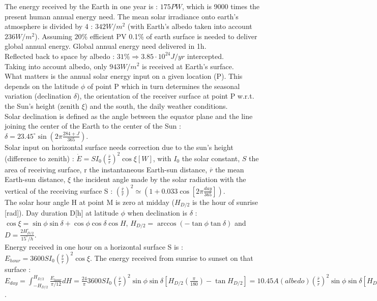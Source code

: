 \documentclass[../main.tex]{subfiles}
\begin{document}
The energy received by the Earth in one year is : $175PW$, which is 9000 times the present human annual energy need. The mean solar irradiance onto earth's atmosphere is divided by 4 : $342W/m^2$ (with Earth's albedo taken into account $236W/m^2$). Assuming $20\%$ efficient PV 0.1\% of earth surface is needed to deliver global annual energy. Global annual energy need delivered in 1h. \\

Reflected back to space by albedo : $31\% \Rightarrow 3.85\cdot 10^{24} J/yr$ intercepted.\\
\warning Taking into account albedo, only $943W/m^2$ is received at Earth's surface.\\

What matters is the annual solar energy input on a given location (P). This depends on the latitude $\phi$ of point P which in turn determines the seasonal variation (declination $\delta$), the orientation of the receiver surface at point P w.r.t. the Sun's height (zenith $\xi$) and the south, the daily weather conditions.\\
Solar declination is defined as the angle between the equator plane and the line joining the center of the Earth to the center of the Sun : $\delta = 23.45^\circ \sin(2\pi \frac{284+J}{365})$.\\

Solar input on horizontal surface needs correction due to the sun's height (difference to zenith) : $\dot{E} = SI_0 (\frac{\overline{r}}{r})^2 \cos \xi [W]$, with $I_0$ the solar constant, $S$ the area of receiving surface, r the instantaneous Earth-sun distance, $\overline{r}$ the mean Earth-sun distance, $\xi$ the incident angle made by the solar radiation with the vertical of the receiving surface S : $(\frac{\overline{r}}{r})^2 \simeq (1+0.033\cos[2\pi \frac{day}{365}])$.\\

The solar hour angle H at point M is zero at midday ($H_{D/2}$ is the hour of sunrise [rad]). Day duration D[h] at latitude $\phi$ when declination is $\delta$ : $\cos \xi = \sin \phi \sin \delta + \cos \phi \cos \delta \cos H$, $H_{D/2} = \arccos(-\tan \phi \tan \delta)$ and $D = \frac{2 H_{D/2}^\circ}{15^\circ/h}$.\\

Energy received in one hour on a horizontal surface S is : $E_{hour} = 3600 S I_0 (\frac{\overline{r}}{r})^2 \cos \xi$. The energy received from sunrise to sunset on that surface : $E_{day} = \int_{-H_{D/2}}^{H_{D/2}} \frac{E_{hour}}{\pi/12} dH = \frac{24}{\pi} 3600 S I_0 (\frac{\overline{r}}{r})^2 \sin\phi \sin \delta [H_{D/2} (\frac{\pi}{180}) - \tan H_{D/2}] = 10.45 A(albedo)(\frac{\overline{r}}{r})^2 \sin\phi \sin \delta [H_{D/2} (\frac{\pi}{180}) - \tan H_{D/2}] \: [kWh/m^2]$.\\
\end{document}
